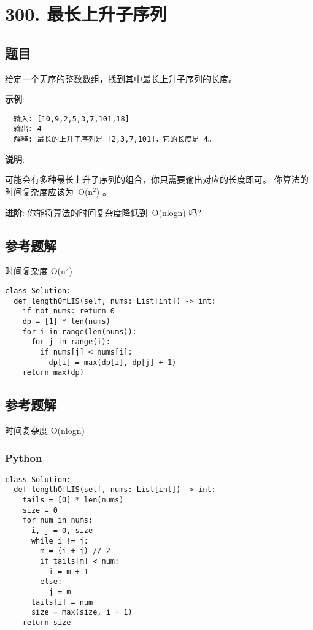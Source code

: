 \newpage
\section{300. 最长上升子序列}
\label{leetcode:300}

\subsection{题目}

给定一个无序的整数数组，找到其中最长上升子序列的长度。

\textbf{示例}:

\begin{verbatim}
  输入: [10,9,2,5,3,7,101,18]
  输出: 4
  解释: 最长的上升子序列是 [2,3,7,101]，它的长度是 4。
\end{verbatim}

\textbf{说明}:

可能会有多种最长上升子序列的组合，你只需要输出对应的长度即可。
你算法的时间复杂度应该为 O(n$^{2}$) 。

\textbf{进阶}: 你能将算法的时间复杂度降低到 O(nlogn) 吗?

\subsection{参考题解}

时间复杂度 O(n$^{2}$)

\begin{verbatim}
class Solution:
  def lengthOfLIS(self, nums: List[int]) -> int:
    if not nums: return 0
    dp = [1] * len(nums)
    for i in range(len(nums)):
      for j in range(i):
        if nums[j] < nums[i]:
          dp[i] = max(dp[i], dp[j] + 1)
    return max(dp)
\end{verbatim}

\subsection{参考题解}

时间复杂度 O(nlogn)

\subsubsection{Python}

\begin{verbatim}
class Solution:
  def lengthOfLIS(self, nums: List[int]) -> int:
    tails = [0] * len(nums)
    size = 0
    for num in nums:
      i, j = 0, size
      while i != j:
        m = (i + j) // 2
        if tails[m] < num:
          i = m + 1
        else:
          j = m
      tails[i] = num
      size = max(size, i + 1)
    return size
\end{verbatim}

